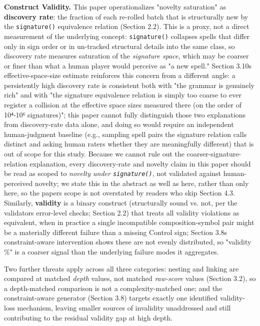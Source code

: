 \documentclass[
  10pt,
  twocolumn]{article}
\begin{document}
\textbf{Construct Validity.} This paper operationalizes "novelty
saturation" as \textbf{discovery rate}: the fraction of each re-rolled
batch that is structurally new by the \texttt{signature()} equivalence
relation (Section 2.2). This is a proxy, not a direct measurement of the
underlying concept: \texttt{signature()} collapses spells that differ
only in sign order or in un-tracked structural details into the same
class, so discovery rate measures saturation of the \emph{signature
space}, which may be coarser or finer than what a human player would
perceive as "a new spell." Section 3.10\textquotesingle s
effective-space-size estimate reinforces this concern from a different
angle: a persistently high discovery rate is consistent both with "the
grammar is genuinely rich" and with "the signature equivalence relation
is simply too coarse to ever register a collision at the effective space
sizes measured there (on the order of 10⁴-10⁶ signatures)"; this paper
cannot fully distinguish those two explanations from discovery-rate data
alone, and doing so would require an independent human-judgment baseline
(e.g., sampling spell pairs the signature relation calls distinct and
asking human raters whether they are meaningfully different) that is out
of scope for this study. Because we cannot rule out the
coarser-signature-relation explanation, every discovery-rate and novelty
claim in this paper should be read as scoped to \emph{novelty under
\texttt{signature()}}, not validated against human-perceived novelty; we
state this in the abstract as well as here, rather than only here, so
the paper\textquotesingle s scope is not overstated by readers who skip
Section 4.3. Similarly, \textbf{validity} is a binary construct
(structurally sound vs. not, per the validator\textquotesingle s
error-level checks; Section 2.2) that treats all validity violations as
equivalent, when in practice a single incompatible composition-symbol
pair might be a materially different failure than a missing Control
sign; Section 3.8\textquotesingle s constraint-aware intervention shows
these are not evenly distributed, so "validity \%" is a coarser signal
than the underlying failure modes it aggregates.

Two further threats apply across all three categories: nesting and
linking are compared at matched \emph{depth} values, not matched
\emph{raw-score} values (Section 3.2), so a depth-matched comparison is
not a complexity-matched one; and the constraint-aware generator
(Section 3.8) targets exactly one identified validity-loss mechanism,
leaving smaller sources of invalidity unaddressed and still contributing
to the residual validity gap at high depth.
\end{document}
